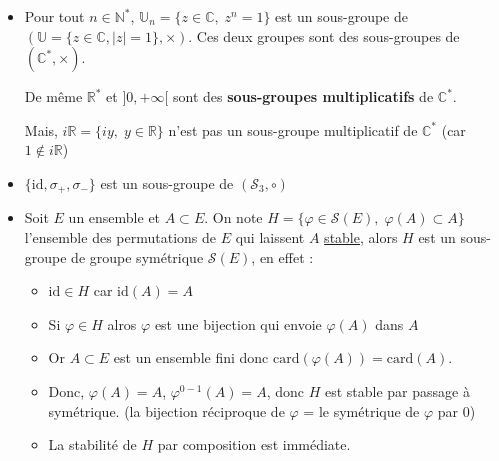 \begin{Example}{}{}
\begin{itemize}

  \item Pour tout $n \in \mathbb{N} ^{*}$, $\mathbb{U}_n = \{z \in \mathbb{C}, \; z ^{n} = 1\}$ est un sous-groupe de $(\mathbb{U} = \{z \in \mathbb{C}, |z| = 1\}, \times)$. Ces deux groupes sont des sous-groupes de $(\mathbb{C} ^{*}, \times)$. 

      De même $\mathbb{R} ^{*}$ et $]0, +\infty[$ sont des \textbf{sous-groupes multiplicatifs} de $\mathbb{C} ^{*}$.

      Mais, $i \mathbb{R} = \{ iy, \; y \in \mathbb{R}\}$ n'est pas un sous-groupe multiplicatif de $\mathbb{C} ^{*}$ (car $1 \not\in i \mathbb{R}$) 

    \item $\{\mathrm{id}, \sigma_+, \sigma_-\}$ est un sous-groupe de $(\mathscr{S}_3, \circ)$

    \item Soit $E$ un ensemble et $A \subset E$. On note $H = \{ \varphi \in \mathscr{S}(E), \; \varphi(A) \subset A \}$ l'ensemble des permutations de $E$ qui laissent $A$ \underline{stable}, alors $H$ est un sous-groupe de groupe symétrique $\mathscr{S}(E)$, en effet : 
      \begin{itemize}

          \item $\mathrm{id} \in H$  car $\mathrm{id}(A) = A$ 
          
          \item Si $\varphi \in H$ alros $\varphi$ est une bijection qui envoie $\varphi(A)$ dans $A$ 

          \item Or $A \subset E$ est un ensemble fini donc $\mathrm{card}(\varphi(A)) = \mathrm{card}(A)$. 

          \item Donc, $\varphi(A) =A$, $\varphi ^{0-1} (A) =A$, donc $H$ est stable par passage à symétrique. (la bijection réciproque de $\varphi$ = le symétrique de $\varphi$ par $0$)

          \item La stabilité de $H$ par composition est immédiate.

      \end{itemize}

\end{itemize}

\end{Example}


